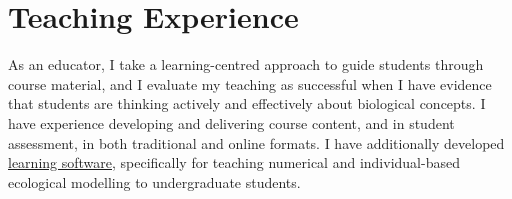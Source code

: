 \documentclass[letterpaper]{article}
\begin{document}
\section*{Teaching Experience}
\hrulefill


As an educator, I take a learning-centred approach to guide students through course material, and I evaluate my teaching as successful when I have evidence that students are thinking actively and effectively about biological concepts. I have experience developing and delivering course content, and in student assessment, in both traditional and online formats. I have additionally developed \href{https://bradduthie.shinyapps.io/EcoEdu/}{learning software}, specifically for teaching numerical and individual-based ecological modelling to undergraduate students.

\hrulefill

\end{document}
